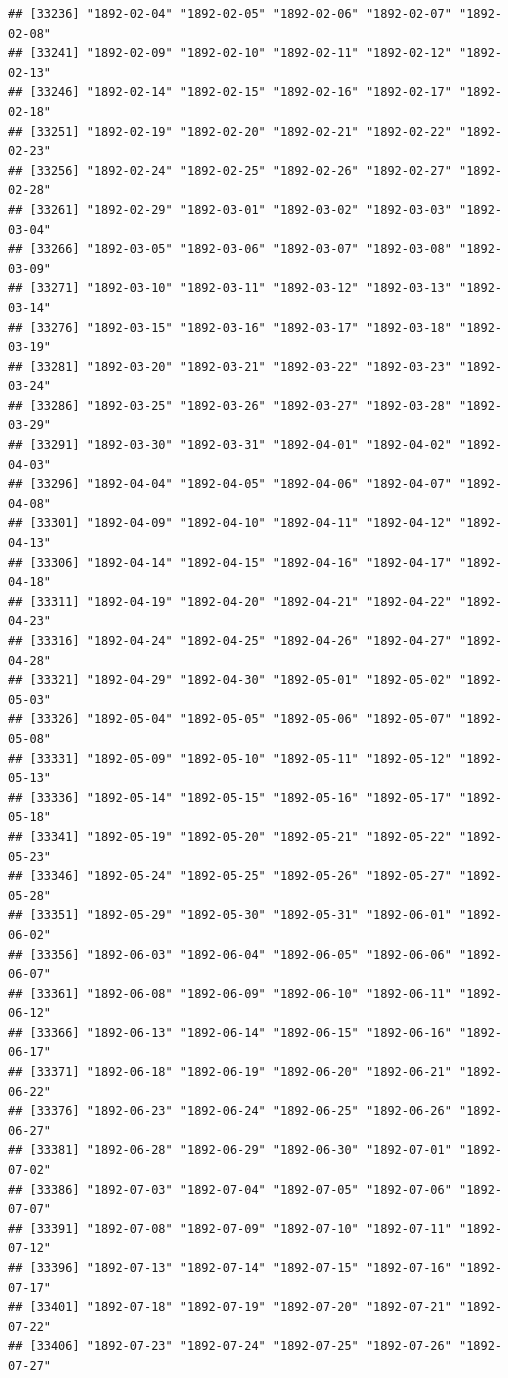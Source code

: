\documentclass{article}\usepackage[]{graphicx}\usepackage[]{color}
\makeatletter
\newenvironment{kframe}{%
 \def\at@end@of@kframe{}%
 \ifinner\ifhmode%
  \def\at@end@of@kframe{\end{minipage}}%
  \begin{minipage}{\columnwidth}%
 \fi\fi%
 \def\FrameCommand##1{\hskip\@totalleftmargin \hskip-\fboxsep
 \colorbox{shadecolor}{##1}\hskip-\fboxsep
     \hskip-\linewidth \hskip-\@totalleftmargin \hskip\columnwidth}%
 \MakeFramed {\advance\hsize-\width
   \@totalleftmargin\z@ \linewidth\hsize
   \@setminipage}}%
 {\par\unskip\endMakeFramed%
 \at@end@of@kframe}
\newenvironment{knitrout}{}{} %
\makeatother
\begin{document}
\begin{description}
\begin{knitrout}
\begin{kframe}
\begin{verbatim}
## [33236] "1892-02-04" "1892-02-05" "1892-02-06" "1892-02-07" "1892-02-08"
## [33241] "1892-02-09" "1892-02-10" "1892-02-11" "1892-02-12" "1892-02-13"
## [33246] "1892-02-14" "1892-02-15" "1892-02-16" "1892-02-17" "1892-02-18"
## [33251] "1892-02-19" "1892-02-20" "1892-02-21" "1892-02-22" "1892-02-23"
## [33256] "1892-02-24" "1892-02-25" "1892-02-26" "1892-02-27" "1892-02-28"
## [33261] "1892-02-29" "1892-03-01" "1892-03-02" "1892-03-03" "1892-03-04"
## [33266] "1892-03-05" "1892-03-06" "1892-03-07" "1892-03-08" "1892-03-09"
## [33271] "1892-03-10" "1892-03-11" "1892-03-12" "1892-03-13" "1892-03-14"
## [33276] "1892-03-15" "1892-03-16" "1892-03-17" "1892-03-18" "1892-03-19"
## [33281] "1892-03-20" "1892-03-21" "1892-03-22" "1892-03-23" "1892-03-24"
## [33286] "1892-03-25" "1892-03-26" "1892-03-27" "1892-03-28" "1892-03-29"
## [33291] "1892-03-30" "1892-03-31" "1892-04-01" "1892-04-02" "1892-04-03"
## [33296] "1892-04-04" "1892-04-05" "1892-04-06" "1892-04-07" "1892-04-08"
## [33301] "1892-04-09" "1892-04-10" "1892-04-11" "1892-04-12" "1892-04-13"
## [33306] "1892-04-14" "1892-04-15" "1892-04-16" "1892-04-17" "1892-04-18"
## [33311] "1892-04-19" "1892-04-20" "1892-04-21" "1892-04-22" "1892-04-23"
## [33316] "1892-04-24" "1892-04-25" "1892-04-26" "1892-04-27" "1892-04-28"
## [33321] "1892-04-29" "1892-04-30" "1892-05-01" "1892-05-02" "1892-05-03"
## [33326] "1892-05-04" "1892-05-05" "1892-05-06" "1892-05-07" "1892-05-08"
## [33331] "1892-05-09" "1892-05-10" "1892-05-11" "1892-05-12" "1892-05-13"
## [33336] "1892-05-14" "1892-05-15" "1892-05-16" "1892-05-17" "1892-05-18"
## [33341] "1892-05-19" "1892-05-20" "1892-05-21" "1892-05-22" "1892-05-23"
## [33346] "1892-05-24" "1892-05-25" "1892-05-26" "1892-05-27" "1892-05-28"
## [33351] "1892-05-29" "1892-05-30" "1892-05-31" "1892-06-01" "1892-06-02"
## [33356] "1892-06-03" "1892-06-04" "1892-06-05" "1892-06-06" "1892-06-07"
## [33361] "1892-06-08" "1892-06-09" "1892-06-10" "1892-06-11" "1892-06-12"
## [33366] "1892-06-13" "1892-06-14" "1892-06-15" "1892-06-16" "1892-06-17"
## [33371] "1892-06-18" "1892-06-19" "1892-06-20" "1892-06-21" "1892-06-22"
## [33376] "1892-06-23" "1892-06-24" "1892-06-25" "1892-06-26" "1892-06-27"
## [33381] "1892-06-28" "1892-06-29" "1892-06-30" "1892-07-01" "1892-07-02"
## [33386] "1892-07-03" "1892-07-04" "1892-07-05" "1892-07-06" "1892-07-07"
## [33391] "1892-07-08" "1892-07-09" "1892-07-10" "1892-07-11" "1892-07-12"
## [33396] "1892-07-13" "1892-07-14" "1892-07-15" "1892-07-16" "1892-07-17"
## [33401] "1892-07-18" "1892-07-19" "1892-07-20" "1892-07-21" "1892-07-22"
## [33406] "1892-07-23" "1892-07-24" "1892-07-25" "1892-07-26" "1892-07-27"

\end{verbatim}
\end{kframe}
\end{knitrout}
\end{description}
\end{document}
